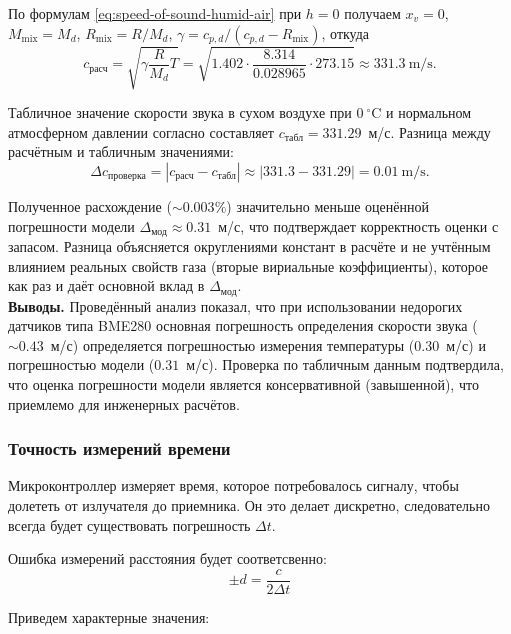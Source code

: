 \documentclass[a4paper,11pt]{article} %
\begin{document}
По формулам \eqref{eq:speed-of-sound-humid-air} при $h = 0$ получаем $x_v = 0$, $M_{\text{mix}} = M_d$, $R_{\text{mix}} = R/M_d$, $\gamma = c_{p,d}/(c_{p,d} - R_{\text{mix}})$, откуда
\begin{equation}
    c_{\text{расч}} = \sqrt{\gamma \frac{R}{M_d} T} = \sqrt{1.402 \cdot \frac{8.314}{0.028965} \cdot 273.15} \approx 331.3\ \mathrm{m/s}.
\end{equation}

Табличное значение скорости звука в сухом воздухе при $0\ ^\circ\mathrm{C}$ и нормальном атмосферном давлении согласно \cite{iso2533} составляет $c_{\text{табл}} = 331.29$~м/с. Разница между расчётным и табличным значениями:
\begin{equation}
    \Delta c_{\text{проверка}} = |c_{\text{расч}} - c_{\text{табл}}| \approx |331.3 - 331.29| = 0.01\ \mathrm{m/s}.
\end{equation}

Полученное расхождение ($\sim 0.003\%$) значительно меньше оценённой погрешности модели $\Delta_{\text{мод}} \approx 0.31$~м/с, что подтверждает корректность оценки с запасом. Разница объясняется округлениями констант в расчёте и не учтённым влиянием реальных свойств газа (вторые вириальные коэффициенты), которое как раз и даёт основной вклад в $\Delta_{\text{мод}}$.
\\

\textbf{Выводы.}
Проведённый анализ показал, что при использовании недорогих датчиков типа BME280 основная погрешность определения скорости звука ($\sim 0.43$~м/с) определяется погрешностью измерения температуры ($0.30$~м/с) и погрешностью модели ($0.31$~м/с). Проверка по табличным данным подтвердила, что оценка погрешности модели является консервативной (завышенной), что приемлемо для инженерных расчётов.


\subsubsection{Точность измерений времени}
Микроконтроллер измеряет время, которое потребовалось сигналу, чтобы долететь от излучателя до приемника.
Он это делает дискретно, следовательно всегда будет существовать погрешность $\Delta t$.

Ошибка измерений расстояния будет соответсвенно:
\begin{equation}
 \pm d = \frac{c}{2 \Delta t}
\end{equation}

Приведем характерные значения:
\end{document}
